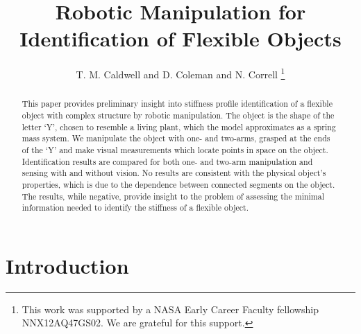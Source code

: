 \documentclass[runningheads,a4paper]{llncs}
\begin{document}
\mainmatter  %

\title{Robotic Manipulation for Identification of Flexible Objects}



\author{T. M. Caldwell and  D. Coleman and N. Correll%
\thanks{
This work was supported by a NASA
Early Career Faculty fellowship NNX12AQ47GS02. We are grateful for this support.}%
}
%


\maketitle

\begin{abstract}
This paper provides preliminary insight into stiffness profile identification of a flexible object with complex structure by robotic manipulation. The object is the shape of the letter `Y', chosen to resemble a living plant, which the model approximates as a spring mass system. We manipulate the object with one- and two-arms, grasped at the ends of the `Y' and make visual measurements which locate points in space on the object.  Identification results are compared for both one- and two-arm manipulation and sensing with and without vision. No results are consistent with the physical object's properties, which is due to the dependence between connected segments on the object. The results, while negative, provide insight to the problem of assessing the minimal information needed to identify the stiffness of a flexible object.%
\end{abstract}

\section{Introduction}
\end{document}
